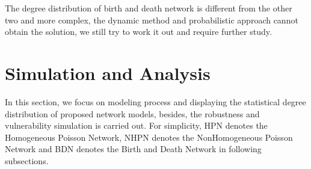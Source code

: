 \documentclass[final]{IEEEtran}
\begin{document}
%
%
%
%

The degree distribution of birth and death network is different
from the other two and more complex, the dynamic method and
probabilistic approach cannot obtain the solution, we still try to
work it out and require further study.

\section{Simulation and Analysis}
In this section, we focus on modeling process and displaying the
statistical degree distribution of proposed network models,
besides, the robustness and vulnerability simulation is carried
out. For simplicity, HPN denotes the Homogeneous Poisson Network,
NHPN denotes the NonHomogeneous Poisson Network and BDN denotes
the Birth and Death Network in following subsections.
\end{document}
